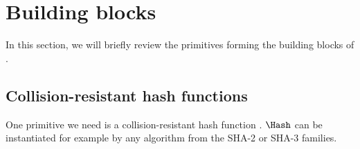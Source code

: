 \section{Building blocks}%
\label{Primitives}\label{building-blocks}

In this section, we will briefly review the primitives forming the building blocks of \CROCUS.

\subsection{Collision-resistant hash functions}

One primitive we need is a collision-resistant hash function \Hash.
\(\Hash\) can be instantiated for example by any algorithm from the SHA-2 or SHA-3 families.











